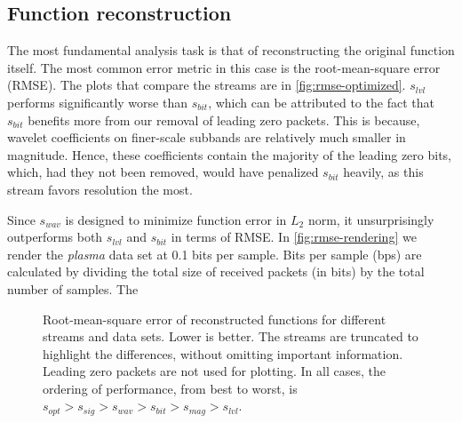 \subsection{Function reconstruction}\label{sec:rmse-optimized}

The most fundamental analysis task is that of reconstructing the original function itself. The most
common error metric in this case is the root-mean-square error (RMSE). The plots that compare the
streams are in \autoref{fig:rmse-optimized}. $s_{lvl}$ performs significantly worse than $s_{bit}$,
which can be attributed to the fact that $s_{bit}$ benefits more from our removal of leading zero
packets. This is because, wavelet coefficients on finer-scale subbands are relatively much smaller
in magnitude. Hence, these coefficients contain the majority of the leading zero bits, which, had
they not been removed, would have penalized $s_{bit}$ heavily, as this stream favors resolution the
most.

Since $s_{wav}$ is designed to minimize function error in $L_2$ norm, it unsurprisingly outperforms
both $s_{lvl}$ and $s_{bit}$ in terms of RMSE. In \autoref{fig:rmse-rendering} we render the
\emph{plasma} data set at 0.1 bits per sample. Bits per sample (bps) are calculated by dividing the
total size of received packets (in bits) by the total number of samples. The 

\begin{figure}[h]
  \centering
		\caption{Root-mean-square error of reconstructed functions for different streams and data sets.
		Lower is better. The streams are truncated to highlight the differences, without omitting
		important information. Leading zero packets are not used for plotting. In all cases, the
		ordering of performance, from best to worst, is $s_{opt} > s_{sig} > s_{wav} > s_{bit} > s_{mag}
		> s_{lvl}$.}\label{fig:rmse-optimized}
\end{figure}

